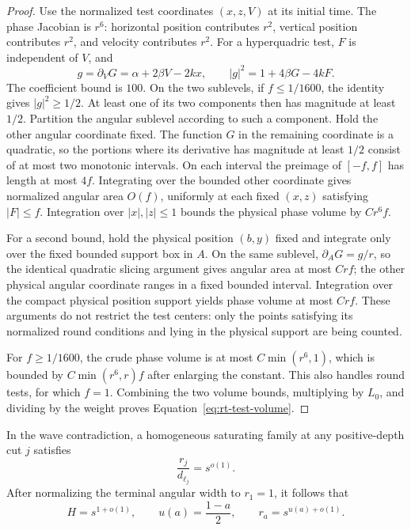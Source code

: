 \begin{proof}
Use the normalized test coordinates $(x,z,V)$ at its initial time.
The phase Jacobian is $r^6$: horizontal position contributes $r^2$,
vertical position contributes $r^2$, and velocity contributes $r^2$.
For a hyperquadric test, $F$ is independent of $V$, and
\[
 g=\partial_VG=\alpha+2\beta V-2kx,
 \qquad |g|^2=1+4\beta G-4kF.
\]
The coefficient bound is $100$.  On the two sublevels, if
$f\le1/1600$, the identity gives $|g|^2\ge1/2$.
At least one of its two components then has magnitude at least
$1/2$.  Partition the angular sublevel according to such a
component.  Hold the other angular coordinate fixed.  The function
$G$ in the remaining coordinate is a quadratic, so the portions
where its derivative has magnitude at least $1/2$ consist of at
most two monotonic intervals.  On each interval the preimage of
$[-f,f]$ has length at most $4f$.  Integrating over the bounded
other coordinate gives normalized angular area $O(f)$, uniformly
at each fixed $(x,z)$ satisfying $|F|\le f$.  Integration over
$|x|,|z|\le1$ bounds the physical phase volume by $Cr^6f$.

For a second bound, hold the physical position $(b,y)$ fixed and
integrate only over the fixed bounded support box in $A$.  On the
same sublevel, $\partial_A G=g/r$, so the identical quadratic
slicing argument gives angular area at most $Crf$; the other
physical angular coordinate ranges in a fixed bounded interval.
Integration over the compact physical position support yields
phase volume at most $Crf$.  These arguments do not restrict the
test centers: only the points satisfying its normalized round
conditions and lying in the physical support are being counted.

For $f\ge1/1600$, the crude phase volume is at most
$C\min(r^6,1)$, which is bounded by
$C\min(r^6,r)f$ after enlarging the constant.  This also handles
round tests, for which $f=1$.  Combining the two volume bounds,
multiplying by $L_0$, and dividing by the weight proves
Equation~\eqref{eq:rt-test-volume}.
\end{proof}

\begin{proposition}
\label{prop:rt-planck}
In the wave contradiction, a homogeneous saturating family at any
positive-depth cut $j$ satisfies
\begin{equation}
 \frac{r_j}{d_{\ell_j}}=s^{o(1)}.
 \tag{round-Pl}\label{eq:round-Pl}
\end{equation}
After normalizing the terminal angular width to $r_1=1$, it follows that
\begin{equation}
 H=s^{1+o(1)},\qquad u(a)=\frac{1-a}{2},\qquad
 r_a=s^{u(a)+o(1)}.
 \tag{round-u}\label{eq:round-u}
\end{equation}
\end{proposition}

